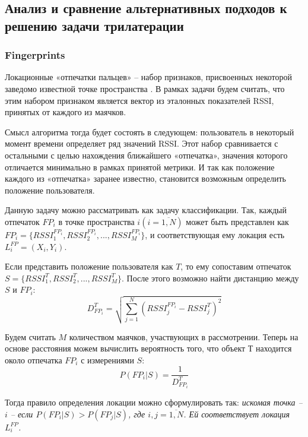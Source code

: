 \subsection{Анализ и сравнение альтернативных подходов к решению задачи трилатерации}

\subsubsection{Fingerprints}

Локационные «отпечатки пальцев» – набор признаков, присвоенных некоторой заведомо известной точке пространства \cite{elbes2013precise}.  В рамках задачи будем считать, что этим набором признаком является вектор из эталонных показателей RSSI, принятых от каждого из маячков.

Смысл алгоритма тогда будет состоять в следующем: пользователь в некоторый момент времени определяет ряд значений RSSI. Этот набор сравнивается с остальными с целью нахождения ближайшего «отпечатка», значения которого отличается минимально в рамках принятой метрики. И так как положение каждого из «отпечатка» заранее известно, становится возможным определить положение пользователя.

Данную задачу можно рассматривать как задачу классификации. Так, каждый отпечаток $FP_i$ в точке пространства $i (i=\overline{1,N})$ может быть представлен как $FP_i = \{ RSSI_1^{FP_i}, RSSI_2^{FP_i}, ..., RSSI_M^{FP_i} \}$, и соответствующая ему локация есть $L_i^{FP} = (X_i, Y_i)$.

Если представить положение пользователя как $T$, то ему сопоставим отпечаток $ S = \{ RSSI_1^T, RSSI_2^T, ..., RSSI_M^T \}$. После этого возможно найти дистанцию между $S$ и $FP_i$:
\begin{equation} \label{for:D}
    D^T_{FP_i} = \sqrt{ \sum_{j=1}^N ( RSSI_j^{FP_i} - RSSI_j^T )^2 }
\end{equation}

Будем считать $M$ количеством маячков, участвующих в рассмотрении. Теперь на основе расстояния можем вычислить вероятность того, что объект $Т$ находится около отпечатка $FP_i$ с измерениями $S$:
\begin{equation} \label{for:Prob}
    P(FP_i | S) = \frac{1}{ D^T_{FP_i} }
\end{equation}

Тогда правило определения локации можно сформулировать так: \textit{искомая точка – $i$ – если $P(FP_i | S) > P(FP_j | S)$, где $i,j = \overline{1,N}$. Ей соответствует локация $L_i^{FP}$.}

